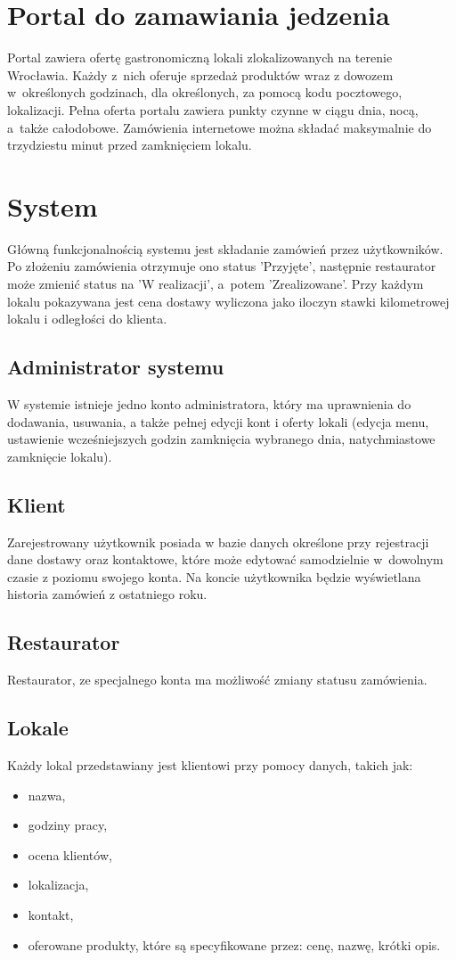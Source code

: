 \documentclass[12pt, a4paper, oneside]{article}
\begin{document}
\section{Portal do zamawiania jedzenia}
\indent\indent Portal zawiera ofertę gastronomiczną lokali zlokalizowanych na terenie Wrocławia. Każdy z~nich oferuje sprzedaż produktów wraz z dowozem w~określonych godzinach, dla określonych, za pomocą kodu pocztowego, lokalizacji. Pełna oferta portalu zawiera punkty czynne w ciągu dnia, nocą, a~także całodobowe. Zamówienia internetowe można składać maksymalnie do trzydziestu minut przed zamknięciem lokalu.
\section{System}
\indent\indent Główną funkcjonalnością systemu jest składanie zamówień przez użytkowników. Po złożeniu zamówienia otrzymuje ono status 'Przyjęte', następnie restaurator może zmienić status na 'W realizacji', a~potem 'Zrealizowane'. Przy każdym lokalu pokazywana jest cena dostawy wyliczona jako iloczyn stawki kilometrowej lokalu i odległości do klienta.
\subsection{Administrator systemu}
\indent\indent W systemie istnieje jedno konto administratora, który ma uprawnienia do dodawania, usuwania, a także pełnej edycji kont i oferty lokali (edycja menu, ustawienie wcześniejszych godzin zamknięcia wybranego dnia, natychmiastowe zamknięcie lokalu).
\subsection{Klient}
\indent\indent Zarejestrowany użytkownik posiada w bazie danych określone przy rejestracji dane dostawy oraz kontaktowe, które może edytować samodzielnie w~dowolnym czasie z poziomu swojego konta. Na koncie użytkownika będzie wyświetlana historia zamówień z ostatniego roku.
\subsection{Restaurator}
\indent\indent Restaurator, ze specjalnego konta ma możliwość zmiany statusu zamówienia.
\subsection{Lokale}
\indent\indent Każdy lokal przedstawiany jest klientowi przy pomocy danych, takich jak:
\begin{itemize}
\item nazwa,
\item godziny pracy,
\item ocena klientów,
\item lokalizacja,
\item kontakt,
\item oferowane produkty, które są specyfikowane przez: cenę, nazwę, krótki opis.
\end{itemize}
\end{document}
